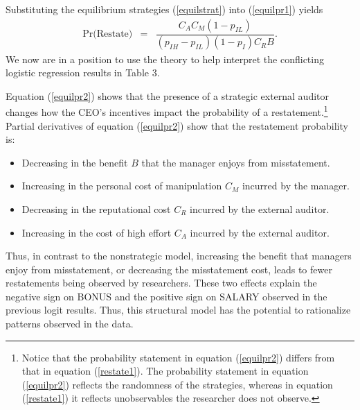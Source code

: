 Substituting the equilibrium strategies (\ref{equilstrat}) into (\ref{equilpr1}) yields
\begin{equation} \label{equilpr2}
\begin{array}{lcl}
\mbox{Pr(Restate)}& = &  \dfrac{C_AC_M(1-p_{IL})}{(p_{IH}-p_{IL})(1-p_I)C_RB}.
\end{array}\end{equation}
We now are in a position to use the theory to help interpret the conflicting logistic regression results
in Table 3. 

Equation (\ref{equilpr2}) shows that the presence of a strategic external auditor
changes how the CEO's incentives impact the probability of a restatement.\footnote{Notice that
the probability statement in equation  (\ref{equilpr2})  differs from that in equation (\ref{restate1}).
The probability statement in equation  (\ref{equilpr2}) reflects the randomness of the
strategies, whereas in equation (\ref{restate1}) it reflects unobservables the researcher 
does not observe.} Partial derivatives of equation (\ref{equilpr2}) show that the restatement probability is:\\

\begin{itemize}
\item Decreasing in the benefit $B$ that the manager enjoys from misstatement.
\item Increasing in the personal cost of manipulation $C_M$ incurred by the manager.
\item Decreasing in the reputational cost $C_R$ incurred by the external auditor.
\item Increasing in the cost of high effort $C_A$ incurred by the external auditor.
\end{itemize}

Thus, in contrast to the nonstrategic model, increasing the benefit that managers enjoy from misstatement,
or decreasing the misstatement cost, leads to fewer restatements being observed by researchers.
These two effects explain the negative sign on BONUS and the positive sign on SALARY observed in the previous logit results. Thus, this structural model has the potential to rationalize patterns observed in the data.

